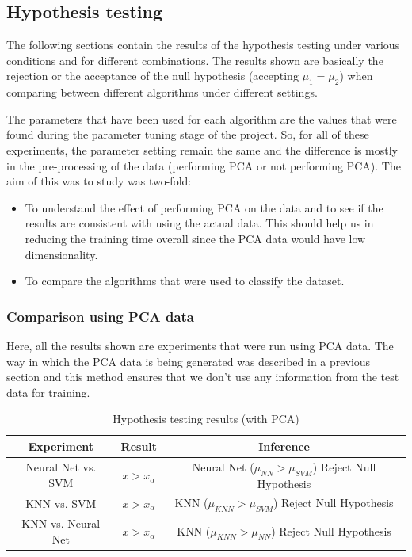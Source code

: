 \documentclass[10pt]{scrartcl}
\begin{document}
\subsection*{Hypothesis testing}

The following sections contain the results of the hypothesis testing under various conditions and for different combinations. The results shown are basically the rejection or the acceptance of the null hypothesis (accepting $\mu_{1} = \mu_{2}$) when comparing between different algorithms under different settings.

The parameters that have been used for each algorithm are the values that were found during the parameter tuning stage of the project. So, for all of these experiments, the parameter setting remain the same and the difference is mostly in the pre-processing of the data (performing PCA or not performing PCA). The aim of this was to study was two-fold:

\begin{itemize}
\item To understand the effect of performing PCA on the data and to see if the results are consistent with using the actual data. This should help us in reducing the training time overall since the PCA data would have low dimensionality. 

\item To compare the algorithms that were used to classify the dataset.
\end{itemize}


\subsubsection*{Comparison using PCA data}

Here, all the results shown are experiments that were run using PCA data. The way in which the PCA data is being generated was described in a previous section and this method ensures that we don't use any information from the test data for training.

\begin{table}[H]
\centering
\begin{tabular}{ c|c|c } 
 \textbf{Experiment} & \textbf{Result} & \textbf{Inference} \\ 
 \hline
Neural Net vs. SVM & $x > x_{\alpha}$ & Neural Net ($\mu_{NN} > \mu_{SVM}$) Reject Null Hypothesis\\ 
KNN vs. SVM & $x > x_{\alpha}$ &  KNN ($\mu_{KNN} > \mu_{SVM}$) Reject Null Hypothesis\\ 
KNN vs. Neural Net & $x > x_{\alpha}$ &  KNN ($\mu_{KNN} > \mu_{NN}$) Reject Null Hypothesis \\
\end{tabular}
\caption{Hypothesis testing results (with PCA) \label{tab:hypo_test_pca}}
\end{table}
\end{document}
